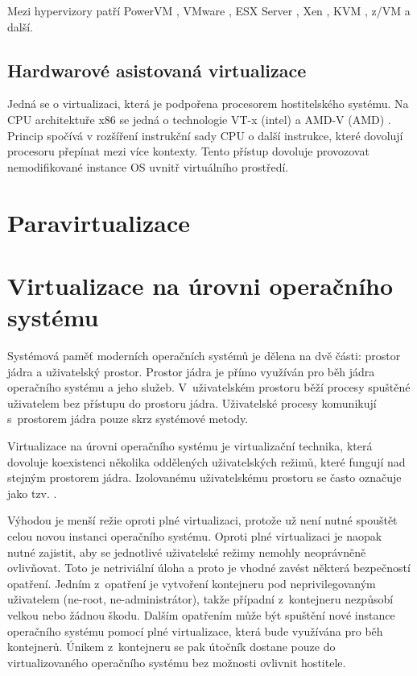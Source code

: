 Mezi hypervizory patří PowerVM , VMware \cite{vmware}, ESX Server \cite{esx_server}, Xen \cite{xen}, KVM \cite{kvm}, z/VM \cite{z_vm} a další.

\subsection{Hardwarové asistovaná virtualizace}

Jedná se o virtualizaci, která je podpořena procesorem hostitelského systému.
Na CPU architektuře x86 se jedná o technologie VT-x (intel) \cite{vt_d} a AMD-V (AMD) \cite{amd_v}.
Princip spočívá v rozšíření instrukční sady CPU o další instrukce, které dovolují procesoru přepínat mezi více kontexty.
Tento přístup dovoluje provozovat nemodifikované instance OS uvnitř virtuálního prostředí.

\section{Paravirtualizace}


\section{Virtualizace na úrovni operačního systému}

Systémová paměť moderních operačních systémů je dělena na dvě části: prostor jádra a uživatelský prostor.
Prostor jádra je přímo využíván pro běh jádra operačního systému a jeho služeb.
V~uživatelském prostoru běží procesy spuštěné uživatelem bez přístupu do prostoru jádra.
Uživatelské procesy komunikují s~prostorem jádra pouze skrz systémové metody.
\cite{kernel_space}


Virtualizace na úrovni operačního systému je virtualizační technika, která dovoluje koexistenci několika oddělených uživatelských režimů, které fungují nad stejným prostorem jádra.
Izolovanému uživatelskému prostoru se často označuje jako tzv. .

Výhodou je menší režie oproti plné virtualizaci, protože už není nutné spouštět celou novou instanci operačního systému.
Oproti plné virtualizaci je naopak nutné zajistit, aby se jednotlivé uživatelské režimy nemohly neoprávněně ovlivňovat.
Toto je netriviální úloha a proto je vhodné zavést některá bezpečností opatření.
Jedním z~opatření je vytvoření kontejneru pod neprivilegovaným uživatelem (ne-root, ne-administrátor), takže případní  z~kontejneru nezpůsobí velkou nebo žádnou škodu.
Dalším opatřením může být spuštění nové instance operačního systému pomocí plné virtualizace, která bude využívána pro běh kontejnerů.
Únikem z~kontejneru se pak útočník dostane pouze do virtualizovaného operačního systému bez možnosti ovlivnit hostitele.

